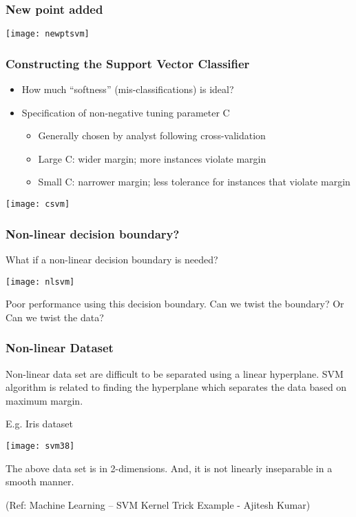 \begin{frame}[fragile]\frametitle{New point added }
\begin{center}
\texttt{[image: newptsvm]}
\end{center}
\end{frame}




\begin{frame}[fragile]\frametitle{Constructing the Support Vector Classifier }
\begin{itemize}
\item How much ``softness'' (mis-classifications) is ideal?
\item Specification of non-negative tuning parameter C
\begin{itemize}
\item Generally chosen by analyst following cross-validation
\item Large C: wider margin; more instances violate margin
\item Small C: narrower margin; less tolerance for instances that violate margin
\end{itemize}
\end{itemize}
\begin{center}
\texttt{[image: csvm]}
\end{center}
\end{frame}


\begin{frame}[fragile]\frametitle{Non-linear decision boundary?}
What if a non-linear decision boundary is needed?
\begin{center}
\texttt{[image: nlsvm]}
\end{center}
Poor performance using this decision boundary.
Can we twist the boundary? Or
Can we twist the data?
\end{frame}

\begin{frame}[fragile] \frametitle{Non-linear Dataset}

Non-linear data set are difficult to be separated using a linear hyperplane. SVM algorithm is related to finding the hyperplane which separates the data based on maximum margin. 

E.g. Iris dataset

\begin{center}
\texttt{[image: svm38]}

\end{center}

The above data set is in 2-dimensions. And, it is not linearly inseparable in a smooth manner.

{\tiny (Ref: Machine Learning – SVM Kernel Trick Example - Ajitesh Kumar)}
\end{frame}


